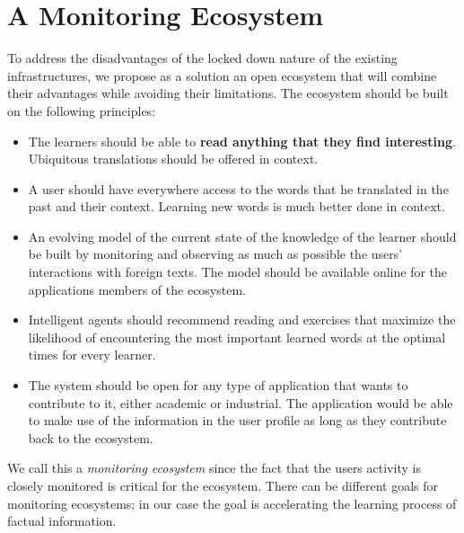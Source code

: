 

\section {A Monitoring Ecosystem}

To address the disadvantages of the locked down nature of the existing infrastructures, we propose as a solution an open ecosystem that will combine their advantages while avoiding their limitations. The ecosystem should be built on the following principles:

\begin{itemize}

	\item The learners should be able to {\bf read anything that they find interesting}. Ubiquitous translations should be offered in context. 

	\item A user should have everywhere access to the words that he translated in the past and their context. Learning new words is much better done in context.


	\item An evolving model of the current state of the knowledge of the learner should be built by monitoring and observing as much as possible the users' interactions with foreign texts. The model should be available online for the applications members of the ecosystem.

	\item Intelligent agents should recommend reading and exercises that maximize the likelihood of encountering the most important learned words at the optimal times for every learner.

	\item The system should be open for any type of application that wants to contribute to it, either academic or industrial. The application would be able to make use of the information in the user profile as long as they contribute back to the ecosystem. 

\end{itemize}

We call this a {\em monitoring ecosystem} since the fact that the users activity is closely monitored is critical for the ecosystem. There can be different goals for monitoring ecosystems; in our case the goal is accelerating the learning process of factual information. 

